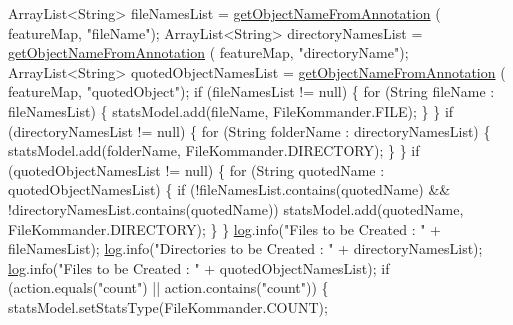 \begin{DoxyCode}
        ArrayList<String> fileNamesList = \hyperlink{classcom_1_1poly_1_1nlp_1_1filekommander_1_1file_1_1actions_1_1_analyse_action_a8652e1bba48585a8c416e6e212fe4766}{getObjectNameFromAnnotation}
      (
                featureMap, \textcolor{stringliteral}{"fileName"});
        ArrayList<String> directoryNamesList = \hyperlink{classcom_1_1poly_1_1nlp_1_1filekommander_1_1file_1_1actions_1_1_analyse_action_a8652e1bba48585a8c416e6e212fe4766}{getObjectNameFromAnnotation}
      (
                featureMap, \textcolor{stringliteral}{"directoryName"});
        ArrayList<String> quotedObjectNamesList = \hyperlink{classcom_1_1poly_1_1nlp_1_1filekommander_1_1file_1_1actions_1_1_analyse_action_a8652e1bba48585a8c416e6e212fe4766}{getObjectNameFromAnnotation}
      (
                featureMap, \textcolor{stringliteral}{"quotedObject"});
        \textcolor{keywordflow}{if} (fileNamesList != null) \{
            \textcolor{keywordflow}{for} (String fileName : fileNamesList) \{
                statsModel.add(fileName, FileKommander.FILE);
            \}
        \}
        \textcolor{keywordflow}{if} (directoryNamesList != null) \{
            \textcolor{keywordflow}{for} (String folderName : directoryNamesList) \{
                statsModel.add(folderName, FileKommander.DIRECTORY);
            \}
        \}
        \textcolor{keywordflow}{if} (quotedObjectNamesList != null) \{
            \textcolor{keywordflow}{for} (String quotedName : quotedObjectNamesList) \{
                \textcolor{keywordflow}{if} (!fileNamesList.contains(quotedName)
                        && !directoryNamesList.contains(quotedName))
                    statsModel.add(quotedName, FileKommander.DIRECTORY);
            \}
        \}
        \hyperlink{classcom_1_1poly_1_1nlp_1_1filekommander_1_1file_1_1actions_1_1_analyse_action_ae99df52b353dd7b0d2014d581fcc8cff}{log}.info(\textcolor{stringliteral}{"Files to be Created : "} + fileNamesList);
        \hyperlink{classcom_1_1poly_1_1nlp_1_1filekommander_1_1file_1_1actions_1_1_analyse_action_ae99df52b353dd7b0d2014d581fcc8cff}{log}.info(\textcolor{stringliteral}{"Directories to be Created : "} + directoryNamesList);
        \hyperlink{classcom_1_1poly_1_1nlp_1_1filekommander_1_1file_1_1actions_1_1_analyse_action_ae99df52b353dd7b0d2014d581fcc8cff}{log}.info(\textcolor{stringliteral}{"Files to be Created : "} + quotedObjectNamesList);
        \textcolor{keywordflow}{if} (action.equals(\textcolor{stringliteral}{"count"}) || action.contains(\textcolor{stringliteral}{"count"})) \{
            statsModel.setStatsType(FileKommander.COUNT);


\end{DoxyCode}
